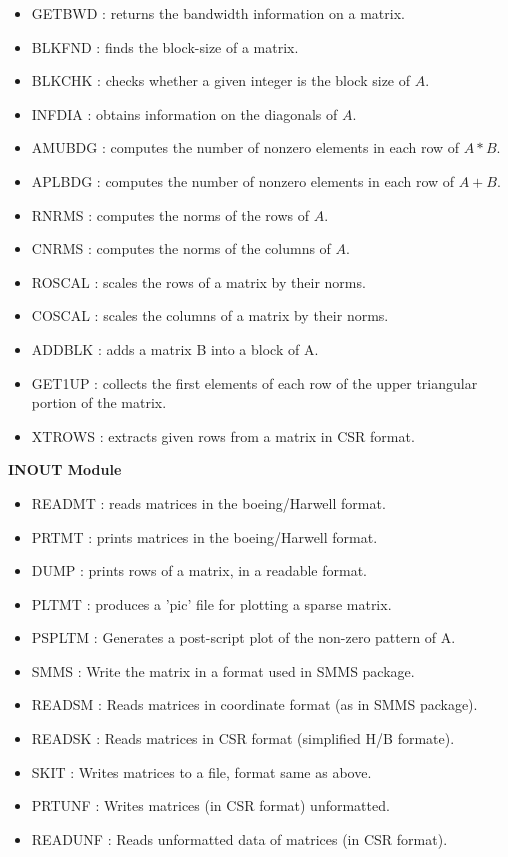\documentclass[12pt]{article}
\begin{document}
\begin{itemize}
\item GETBWD : returns the bandwidth information on a matrix.              
\item BLKFND : finds the block-size of a matrix.        
\item BLKCHK : checks whether a given integer is the block size of $A$.
\item INFDIA : obtains information on the diagonals of $A$.    
\item AMUBDG : computes the number of nonzero elements in each 
	row of $A*B$.
\item APLBDG : computes the number of nonzero elements in each 
	row of $ A+B$. 
\item RNRMS  : computes the norms of the rows of $A$.                
\item CNRMS  : computes the norms of the columns of $A$.                      
\item ROSCAL : scales the rows of a matrix by their norms.                 
\item COSCAL : scales the columns of a matrix by their norms.              
\item ADDBLK : adds a matrix B into a block of A. 
\item GET1UP : collects the first elements of each row of the upper
               triangular portion of the matrix.
\item XTROWS : extracts given rows from a matrix in CSR format.

\end{itemize}

\vskip 0.3in
\centerline{\bf INOUT Module} 

\begin{itemize} 

\item  READMT : reads matrices in the boeing/Harwell format.               
\item  PRTMT  : prints matrices in the boeing/Harwell format.   
\item  DUMP   : prints rows of a matrix,  in a readable format.
\item  PLTMT  : produces a 'pic' file for plotting a sparse matrix.
\item PSPLTM  : Generates a post-script plot of the non-zero 
pattern of A.
\item SMMS    : Write the matrix in a format used in SMMS package.
\item READSM  : Reads matrices in coordinate format (as in SMMS 
package).
\item READSK  : Reads matrices in CSR format (simplified H/B formate).
\item SKIT    : Writes matrices to a file, format same as above.
\item PRTUNF  : Writes matrices (in CSR format) unformatted.
\item READUNF : Reads unformatted data of matrices (in CSR format).
\end{itemize}
\end{document}
